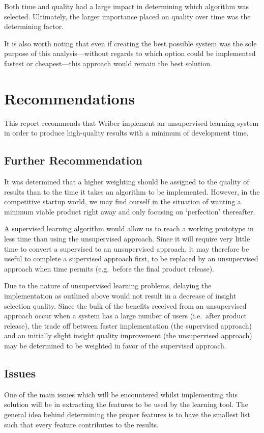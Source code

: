 \documentclass[12pt]{article}
\begin{document}
Both time and quality had a large impact in determining which algorithm was selected. Ultimately, the larger importance placed on quality over time was the determining factor.

It is also worth noting that even if creating the best possible system was the sole purpose of this analysis---without regards to which option could be implemented fastest or cheapest---this approach would remain the best solution.
\newpage


\section{Recommendations}
This report recommends that Wriber implement an unsupervised learning system in order to produce high-quality results with a minimum of development time.

\subsection{Further Recommendation}
It was determined that a higher weighting should be assigned to the quality of results than to the time it takes an algorithm to be implemented. However, in the competitive startup world, we may find ourself in the situation of wanting a minimum viable product right away and only focusing on `perfection' thereafter.

A supervised learning algorithm would allow us to reach a working prototype in less time than using the unsupervised approach. Since it will require very little time to convert a supervised to an unsupervised approach, it may therefore be useful to complete a supervised approach first, to be replaced by an unsupervised approach when time permits (e.g.\ before the final product release).

Due to the nature of unsupervised learning problems, delaying the implementation as outlined above would not result in a decrease of insight selection quality. Since the bulk of the benefits received from an unsupervised approach occur when a system has a large number of users (i.e.\ after product release), the trade off between faster implementation (the supervised approach) and an initially slight insight quality improvement (the unsupervised approach) may be determined to be weighted in favor of the supervised approach.

\subsection{Issues}
One of the main issues which will be encountered whilst implementing this solution will be in extracting the features to be used by the learning tool. The general idea behind determining the proper features is to have the smallest list such that every feature contributes to the results.
\end{document}

